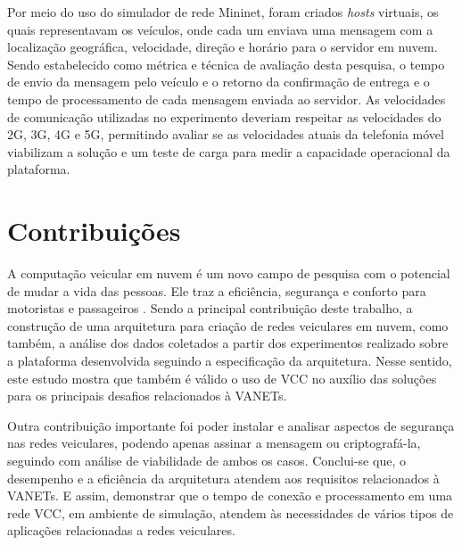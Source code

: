\documentclass[
	12pt,				%
	oneside,			%
	a4paper,			%
	english,			%
	brazil				%
	]{abntex2ppgsi}
\begin{document}
Por meio do uso do simulador de rede Mininet, foram criados \textit{hosts} virtuais, os quais representavam os veículos, onde cada um enviava uma mensagem com a localização geográfica, velocidade, direção e horário para o servidor em nuvem. Sendo estabelecido como métrica e técnica de avaliação desta pesquisa, o tempo de envio da mensagem pelo veículo e o retorno da confirmação de entrega e o tempo de processamento de cada mensagem enviada ao servidor.  As velocidades de comunicação utilizadas no experimento deveriam respeitar as velocidades do 2G, 3G, 4G e 5G, permitindo avaliar se as velocidades atuais da telefonia móvel viabilizam a solução e um teste de carga para medir a capacidade operacional da plataforma.


 
\section{Contribuições}

A computação veicular em nuvem é um novo campo de pesquisa com o potencial de mudar a vida das pessoas. Ele traz a eficiência, segurança e conforto para motoristas e passageiros \cite{falchetti2015vehicular}. Sendo a principal contribuição deste trabalho, a construção de uma arquitetura para criação de redes veiculares em nuvem, como também, a análise dos dados coletados a partir dos experimentos realizado sobre a plataforma desenvolvida seguindo a especificação da arquitetura. Nesse sentido, este estudo mostra que também é válido o uso de VCC no auxílio das soluções para os principais desafios relacionados à VANETs.

Outra contribuição importante foi poder instalar e analisar aspectos de segurança nas redes veiculares, podendo apenas assinar a mensagem ou criptografá-la, seguindo com análise de viabilidade de ambos os casos. Conclui-se que, o desempenho e a eficiência da arquitetura atendem aos requisitos relacionados à VANETs. E assim, demonstrar que o tempo de conexão e processamento em uma rede VCC, em ambiente de simulação, atendem às necessidades de vários tipos de aplicações relacionadas a redes veiculares.
\end{document}
